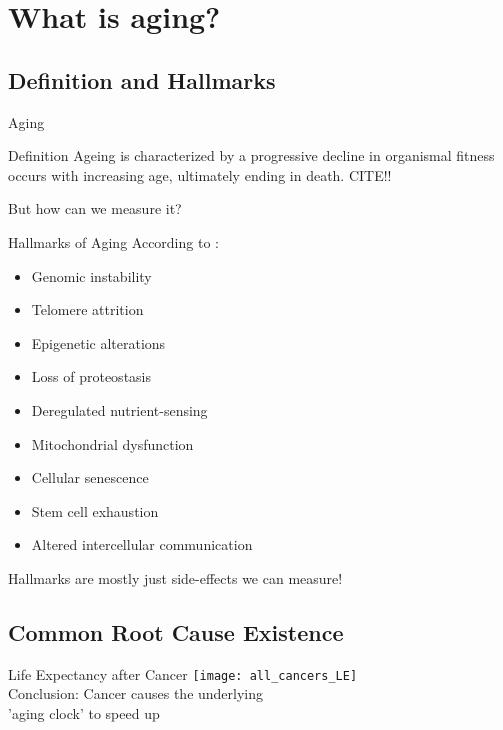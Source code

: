 \section{What is aging?}

\subsection{Definition and Hallmarks}

\begin{frame}[c]{Aging}
    \large
    
    \begin{block}{Definition}
        Ageing is characterized by a progressive decline in organismal fitness
        occurs with increasing age, ultimately ending in death.  CITE!!
    \end{block}
    \pause
    But how can we measure it?
\end{frame}


\begin{frame}[c]{Hallmarks of Aging}
    According to \cite{lopez2013hallmarks}:
    \begin{itemize}[<+(1)->]
        \item Genomic instability
        \item Telomere attrition
        \item Epigenetic alterations
        \item Loss of proteostasis
        \item Deregulated nutrient-sensing
        \item Mitochondrial dysfunction
        \item Cellular senescence
        \item Stem cell exhaustion
        \item Altered intercellular communication
    \end{itemize}
    \pause
    Hallmarks are mostly just side-effects we can measure!
\end{frame}


\subsection{Common Root Cause Existence}

\begin{frame}[c]{Life Expectancy after Cancer}
    \large
    \texttt{[image: all\_cancers\_LE]} \\
    \cite{botta2019changes}
    \newline
    \newline
    \pause
    Conclusion: Cancer causes the underlying \\ 'aging clock' to speed up
\end{frame}

